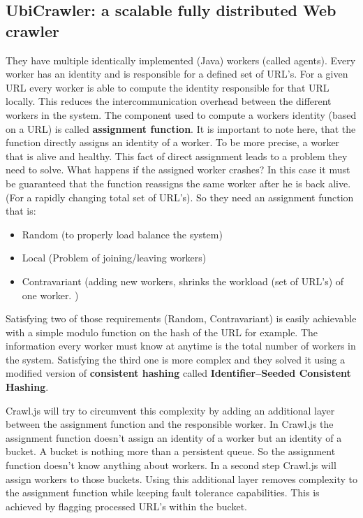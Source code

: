 \subsection{UbiCrawler: a scalable fully distributed Web crawler \cite{ubicrawler}}
They have multiple identically implemented (Java) workers (called agents). Every worker has an identity and is responsible for a defined set of URL's. For a given URL every worker is able to compute the identity responsible for that URL locally. This reduces the intercommunication overhead between the different workers in the system. The component used to compute a workers identity (based on a URL) is called \textbf{assignment function}. It is important to note here, that the function directly assigns an identity of a worker. To be more precise, a worker that is alive and healthy. This fact of direct assignment leads to a problem they need to solve. What happens if the assigned worker crashes? In this case it must be guaranteed that the function reassigns the same worker after he is back alive. (For a rapidly changing total set of URL's). So they need an assignment function that is:
\begin{itemize}
\item Random (to properly load balance the system)
\item Local (Problem of joining/leaving workers)
\item Contravariant (adding new workers, shrinks the workload (set of URL's) of one worker. )
\end{itemize}
Satisfying two of those requirements (Random, Contravariant) is easily achievable with a simple modulo function on the hash of the URL for example. The information every worker must know at anytime is the total number of workers in the system. Satisfying the third one is more complex and they solved it using a modified version of \textbf{consistent hashing} called \textbf{Identifier–Seeded Consistent Hashing}. 

Crawl.js will try to circumvent this complexity by adding an additional layer between the assignment function and the responsible worker. In Crawl.js the assignment function doesn't assign an identity of a worker but an identity of a bucket. A bucket is nothing more than a persistent queue. So the assignment function doesn't know anything about workers. In a second step Crawl.js will assign workers to those buckets. Using this additional layer removes complexity to the assignment function while keeping fault tolerance capabilities. This is achieved by flagging processed URL's within the bucket.
